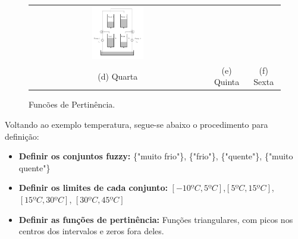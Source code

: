 \begin{figure}[H]
\begin{tabular}{ccc}
	\includegraphics[width=0.3\textwidth,keepaspectratio]{img/4tank.png} \\
	(d) Quarta &
	(e) Quinta &
	(f) Sexta
\end{tabular}
	\caption{\label{figPert}Funcões de Pertinência.}
\end{figure}

Voltando ao exemplo temperatura, segue-se abaixo o procedimento para definição:
\begin{itemize}
	\item \textbf{Definir os conjuntos fuzzy:} \{"muito frio"\}, \{"frio"\}, \{"quente"\}, \{"muito quente"\}
	\item \textbf{Definir os limites de cada conjunto:} $[-10ºC,5ºC]$,$ [5ºC,15ºC]$, $[15ºC,30ºC]$, $[30ºC,45ºC]$ 
	\item \textbf{Definir as funções de pertinência:} Funções triangulares, com picos nos centros dos intervalos e zeros fora deles.
\end{itemize}

